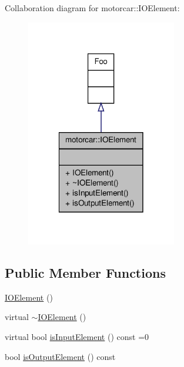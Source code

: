Collaboration diagram for motorcar\-:\-:I\-O\-Element\-:
\nopagebreak
\begin{figure}[H]
\begin{center}
\leavevmode
\includegraphics[width=186pt]{classmotorcar_1_1IOElement__coll__graph}
\end{center}
\end{figure}
\subsection*{Public Member Functions}
\begin{DoxyCompactItemize}
\item 
\hyperlink{classmotorcar_1_1IOElement_aca2725fb65626d1cc50a12192cf5b52b}{I\-O\-Element} ()
\item 
virtual \hyperlink{classmotorcar_1_1IOElement_a6b771ea66fd530dbec633514a490978d}{$\sim$\-I\-O\-Element} ()
\item 
virtual bool \hyperlink{classmotorcar_1_1IOElement_ab73b2687c5452ff694f20c40357ee219}{is\-Input\-Element} () const =0
\item 
bool \hyperlink{classmotorcar_1_1IOElement_a0f451058d4d845c9ffd93c7c0f11af1b}{is\-Output\-Element} () const 
\end{DoxyCompactItemize}


